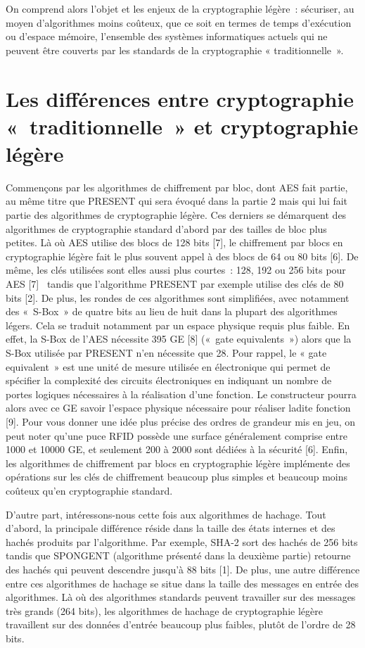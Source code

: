 			On comprend alors l’objet et les enjeux de la cryptographie légère :
		sécuriser, au moyen d’algorithmes moins coûteux, que ce soit en termes de
		temps d’exécution ou d’espace mémoire, l’ensemble des systèmes informatiques
		actuels qui ne peuvent être couverts par les standards de la cryptographie «
		traditionnelle ».

		\section{Les différences entre cryptographie « traditionnelle » et cryptographie légère}

				Commençons par les algorithmes de chiffrement par bloc, dont AES fait partie, au
			même titre que PRESENT qui sera évoqué dans la partie 2 mais qui lui fait partie
			des algorithmes de cryptographie légère. Ces derniers se démarquent des
			algorithmes de cryptographie standard d’abord par des tailles de bloc plus
			petites. Là où AES utilise des blocs de 128 bits [7], le chiffrement par blocs
			en cryptographie légère fait le plus souvent appel à des blocs de 64 ou 80 bits
			[6]. De même, les clés utilisées sont elles aussi plus courtes : 128, 192 ou 256
			bits pour AES [7]  tandis que l’algorithme PRESENT par exemple utilise des clés
			de 80 bits [2]. De plus, les rondes de ces algorithmes sont simplifiées, avec
			notamment des « S-Box » de quatre bits au lieu de huit dans la plupart des
			algorithmes légers. Cela se traduit notamment par un espace physique requis plus
			faible. En effet, la S-Box de l’AES nécessite 395 GE [8] (« gate equivalents »)
			alors que la S-Box utilisée par PRESENT n’en nécessite que 28. Pour rappel, le «
			gate equivalent » est une unité de mesure utilisée en électronique qui permet de
			spécifier la complexité des circuits électroniques en indiquant un nombre de
			portes logiques nécessaires à la réalisation d’une fonction. Le constructeur
			pourra alors avec ce GE savoir l’espace physique nécessaire pour réaliser ladite
			fonction [9]. Pour vous donner une idée plus précise des ordres de grandeur mis
			en jeu, on peut noter qu’une puce RFID possède une surface généralement comprise
			entre 1000 et 10000 GE, et seulement 200 à 2000 sont dédiées à la sécurité [6].
			Enfin, les algorithmes de chiffrement par blocs en cryptographie légère
			implémente des opérations sur les clés de chiffrement beaucoup plus simples et
			beaucoup moins coûteux qu’en cryptographie standard.

				D’autre part, intéressons-nous cette fois aux algorithmes de hachage. Tout
			d’abord, la principale différence réside dans la taille des états internes
			et des hachés produits par l’algorithme. Par exemple, SHA-2 sort des
			hachés de 256 bits tandis que SPONGENT (algorithme présenté dans la
			deuxième partie) retourne des hachés qui peuvent descendre jusqu’à 88 bits
			[1]. De plus, une autre différence entre ces algorithmes de hachage se
			situe dans la taille des messages en entrée des algorithmes. Là où des
			algorithmes standards peuvent travailler sur des messages très grands (264
			bits), les algorithmes de hachage de cryptographie légère travaillent sur
			des données d’entrée beaucoup plus faibles, plutôt de l’ordre de 28 bits.


